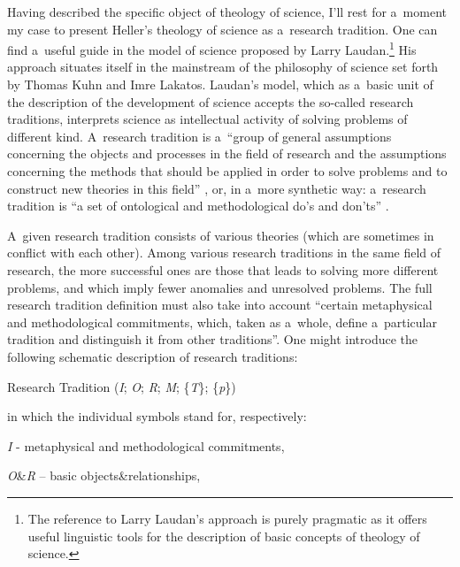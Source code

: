 Having described the specific object of theology of science, I'll rest for a~moment my case to present Heller's theology of science as a~research tradition. One can find a~useful guide in the model of science proposed by Larry Laudan.\footnote{The reference to Larry Laudan's approach is purely pragmatic as it offers useful linguistic tools for the description of basic concepts of theology of science.} His approach situates itself in the mainstream of the philosophy of science set forth by Thomas Kuhn and Imre Lakatos. Laudan's model, which as a~basic unit of the description of the development of science accepts the so-called research traditions, interprets science as intellectual activity of solving problems of different kind. A~research tradition is a~``group of general assumptions concerning the objects and processes in the field of research and the assumptions concerning the methods that should be applied in order to solve problems and to construct new theories in this field'' 
\parencite[][p.81]{laudan_progress_1977}, %
 or, in a~more synthetic way: a~research tradition is ``a set of ontological and methodological do's and don'ts'' 
\parencite[][pp.79–80]{laudan_progress_1977}.%




A~given research tradition consists of various theories (which are sometimes in conflict with each other). Among various research traditions in the same field of research, the more successful ones are those that leads to solving more different problems, and which imply fewer anomalies and unresolved problems. The full research tradition definition must also take into account ``certain metaphysical and methodological commitments, which, taken as a~whole, define a~particular tradition and distinguish it from other traditions''. One might introduce the following schematic description of research traditions:



Research Tradition  (\textit{I}; \textit{O}; \textit{R}; \textit{M}; \{\textit{T}\}; \{\textit{p}\})





in which the individual symbols stand for, respectively:



\textit{I} - metaphysical and methodological commitments,



\textit{O}\&\textit{R} -- basic objects\&relationships,



